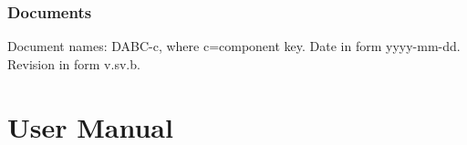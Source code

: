 \documentclass{dabcclass}
\begin{document}
 \cleardoublepage
\thispagestyle{empty} \tableofcontents \thispagestyle{empty} \cleardoublepage
{}


\setcounter{chapter}{0}
\section{Documents}
Document names: DABC-c, where c=component key. Date in form yyyy-mm-dd.
Revision in form v.sv.b.\\

%



%
%

%
%
\cleardoublepage
\part{User Manual}
 \cleardoublepage
\end{document}

